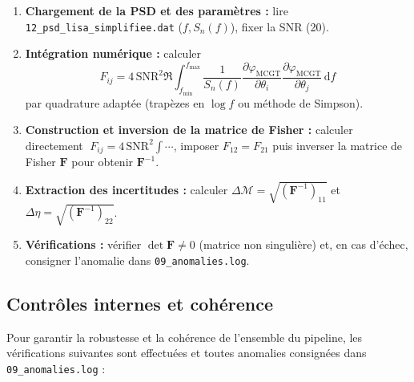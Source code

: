 \begin{enumerate}
  \item \textbf{Chargement de la PSD et des paramètres :}  
  lire \texttt{12\_psd\_lisa\_simplifiee.dat} (\(f,S_{n}(f)\)), fixer la SNR (20).

  \item \textbf{Intégration numérique :}  
    calculer 
    \[
      F_{ij}
      =4\,\mathrm{SNR}^{2}
      \Re\!\int_{f_{\min}}^{f_{\max}}
        \frac{1}{S_{n}(f)}
        \frac{\partial\varphi_{\mathrm{MCGT}}}{\partial\theta_{i}}
        \frac{\partial\varphi_{\mathrm{MCGT}}}{\partial\theta_{j}}
      \,\mathrm{d}f
    \]
    par quadrature adaptée (trapèzes en \(\log f\) ou méthode de Simpson).

  \item \textbf{Construction et inversion de la matrice de Fisher :}  
  calculer directement 
  \(\;F_{ij}=4\,\mathrm{SNR}^{2}\!\int\!\cdots\), imposer \(F_{12}=F_{21}\)  
  puis inverser la matrice de Fisher \(\mathbf{F}\) pour obtenir \(\mathbf{F}^{-1}\).

  \item \textbf{Extraction des incertitudes :}  
    calculer 
    \(\Delta\mathcal{M}=\sqrt{(\mathbf{F}^{-1})_{11}}\) et 
    \(\Delta\eta=\sqrt{(\mathbf{F}^{-1})_{22}}\).

  \item \textbf{Vérifications :}  
  vérifier \(\det\mathbf{F}\neq0\) (matrice non singulière) et, en cas d’échec,  
  consigner l’anomalie dans \texttt{09\_anomalies.log}.
\end{enumerate}

\subsection{Contrôles internes et cohérence}
Pour garantir la robustesse et la cohérence de l’ensemble du pipeline, les vérifications suivantes sont effectuées et toutes anomalies consignées dans \texttt{09\_anomalies.log} :

